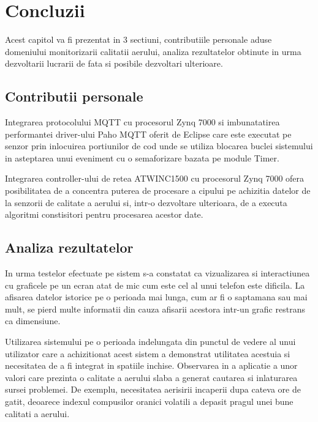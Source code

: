 \chapter{Concluzii}
\pagestyle{fancy}

Acest capitol va fi prezentat in 3 sectiuni, contributiile personale aduse domeniului monitorizarii calitatii aerului, analiza rezultatelor obtinute in urma 
dezvoltarii lucrarii de fata si posibile dezvoltari ulterioare.

\section{Contributii personale}\label{c_contributii}
Integrarea protocolului MQTT cu procesorul Zynq 7000 si imbunatatirea performantei driver-ului Paho MQTT oferit de Eclipse care este executat pe senzor prin 
inlocuirea portiunilor de cod unde se utiliza blocarea buclei sistemului in asteptarea unui eveniment cu o semaforizare bazata pe module Timer.

Integrarea controller-ului de retea ATWINC1500 cu procesorul Zynq 7000 ofera posibilitatea de a concentra puterea de procesare a cipului pe achizitia datelor de 
la senzorii de calitate a aerului si, intr-o dezvoltare ulterioara, de a executa algoritmi constisitori pentru procesarea acestor date.

\section{Analiza rezultatelor}\label{c_analiza_rezultate}
In urma testelor efectuate pe sistem s-a constatat ca vizualizarea si interactiunea cu graficele pe un ecran atat de mic cum este cel al unui telefon este dificila. La 
afisarea datelor istorice pe o perioada mai lunga, cum ar fi o saptamana sau mai mult, se pierd multe informatii din cauza afisarii acestora intr-un grafic restrans 
ca dimensiune. 

Utilizarea sistemului pe o perioada indelungata din punctul de vedere al unui utilizator care a achizitionat acest sistem a demonstrat utilitatea acestuia si necesitatea 
de a fi integrat in spatiile inchise. Observarea in a aplicatie a unor valori care prezinta o calitate a aerului slaba a generat cautarea si inlaturarea sursei problemei. 
De exemplu, necesitatea aerisirii incaperii dupa cateva ore de gatit, deoarece indexul compusilor oranici volatili a depasit pragul unei bune calitati a aerului.

